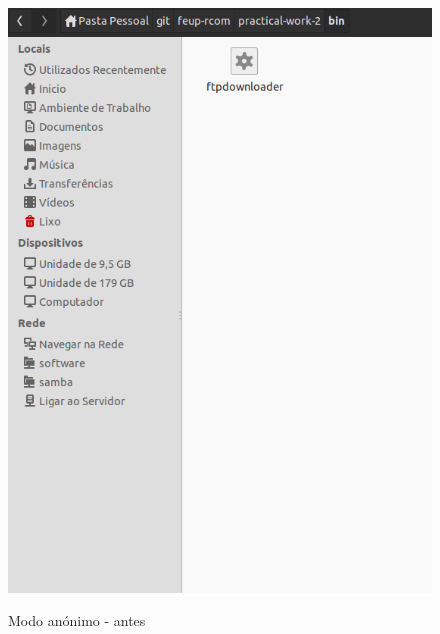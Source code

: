 \documentclass[a4paper]{article}
\begin{document}
\begin{figure}[h!]
\centering
\caption{Modo anónimo - antes}
\includegraphics[scale=0.35]{res/antes-modoanonimo.png}
\label{fig:antesanony}
\end{figure}
\end{document}
